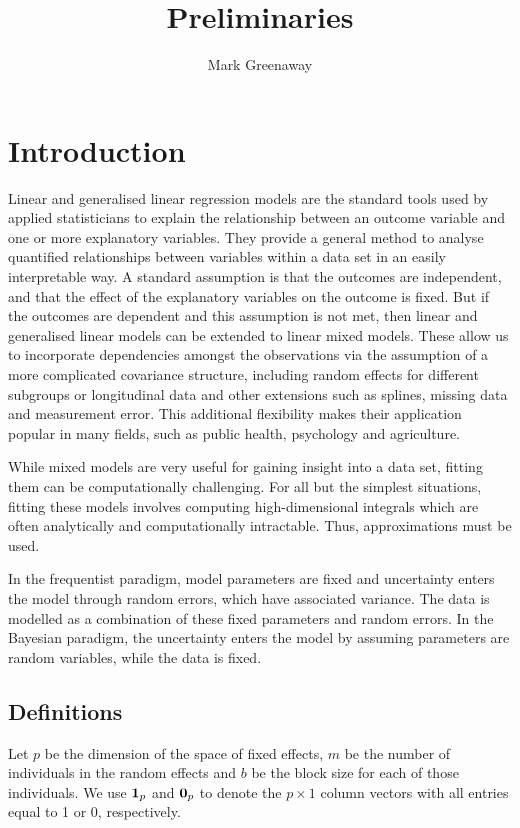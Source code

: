 \documentclass{amsart}[12pt]
\title{Preliminaries}
\author{Mark Greenaway}
\begin{document}
\setlength{\parindent}{0pt}
\maketitle

\section{Introduction}

Linear and generalised linear regression models are the standard tools used by applied statisticians to
explain the relationship between an outcome variable and one or more explanatory variables. They provide a
general method  to analyse quantified relationships between variables within a data set in an easily
interpretable way. A standard assumption is that the outcomes are independent, and that the effect of the
explanatory variables on the outcome is fixed. But if the outcomes are dependent and this assumption is not
met, then linear and generalised linear models can be extended to linear mixed models. These allow us to
incorporate dependencies amongst the  observations via the assumption of a more complicated covariance
structure, including random effects for  different subgroups or longitudinal data and other extensions such as
splines, missing data and measurement error. This additional flexibility makes their application popular in
many fields, such as public health, psychology and agriculture.

While mixed models are very useful for gaining insight into a data set, fitting them can be computationally
challenging. For all but the simplest situations, fitting these models involves computing high-dimensional
integrals which are often analytically and computationally intractable. Thus, approximations must be used.

In the frequentist paradigm, model parameters are fixed and uncertainty enters the model through random
errors, which have associated variance. The data is modelled as a combination of these fixed parameters and
random errors. In the Bayesian paradigm, the uncertainty enters the model by assuming parameters are random
variables, while the data is fixed.

\subsection{Definitions}

Let $p$ be the dimension of the space of fixed effects, $m$ be the number of individuals in the random effects
and $b$ be the block size for each of those individuals. We use ${\bf 1}_p$ and ${\bf 0}_p$ to denote the $p
\times 1$ column vectors with all entries equal to 1 or 0, respectively.
\end{document}
